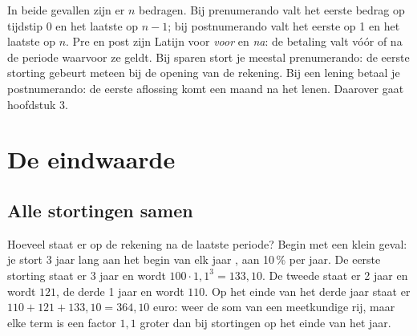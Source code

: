 In beide gevallen zijn er $n$ bedragen. Bij prenumerando valt het eerste bedrag op tijdstip 0 en het laatste op $n - 1$; bij postnumerando valt het eerste op 1 en het laatste op $n$. Pre en post zijn Latijn voor \textit{voor} en \textit{na}: de betaling valt vóór of na de periode waarvoor ze geldt. Bij sparen stort je meestal prenumerando: de eerste storting gebeurt meteen bij de opening van de rekening. Bij een lening betaal je postnumerando: de eerste aflossing komt een maand na het lenen. Daarover gaat hoofdstuk 3.


\begin{oefeningen}
\end{oefeningen}

\section{De eindwaarde}

\subsection{Alle stortingen samen}

Hoeveel staat er op de rekening na de laatste periode? Begin met een klein geval: je stort 3 jaar lang aan het begin van elk jaar , aan 10\,\% per jaar. De eerste storting staat er 3 jaar en wordt $100 \cdot 1{,}1^3 = 133{,}10$. De tweede staat er 2 jaar en wordt $121$, de derde 1 jaar en wordt $110$. Op het einde van het derde jaar staat er $110 + 121 + 133{,}10 = 364{,}10$ euro: weer de som van een meetkundige rij, maar elke term is een factor $1{,}1$ groter dan bij stortingen op het einde van het jaar.

